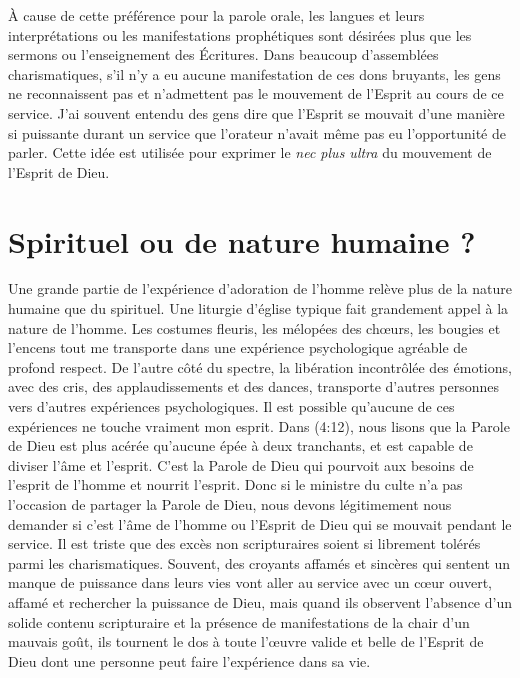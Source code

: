 À cause de cette préférence pour la parole orale, les langues
 et leurs interprétations ou les manifestations prophétiques
 sont désirées plus que les sermons ou l'enseignement des Écritures.
 Dans beaucoup d'assemblées charismatiques, s'il n'y a eu aucune
 manifestation de ces dons bruyants, les gens ne reconnaissent pas
 et n'admettent pas le mouvement de l'Esprit au cours de ce service.
 J'ai souvent entendu des gens dire que l'Esprit se mouvait d'une manière
 si puissante durant un service que l'orateur n'avait même pas eu
 l'opportunité de parler. Cette idée est utilisée pour exprimer le
 \emph{nec plus ultra} du mouvement de l'Esprit de Dieu.


\section*{Spirituel ou de nature humaine ?}

Une grande partie de l'expérience d'adoration de l'homme relève plus
 de la nature humaine que du spirituel.
 Une liturgie d'église typique fait grandement appel à la nature de l'homme.
 Les costumes fleuris, les mélopées des chœurs, les bougies et l'encens
 \ocadr tout me transporte dans une expérience psychologique agréable
 de profond respect. De l'autre côté du spectre, la libération incontrôlée
 des émotions, avec des cris, des applaudissements et des dances,
 transporte d'autres personnes vers d'autres expériences psychologiques.
 Il est possible qu'aucune de ces expériences ne touche vraiment mon esprit.
 Dans (4:12), nous lisons que la Parole de Dieu
 est plus acérée qu'aucune épée à deux tranchants,
 et est capable de diviser l'âme et l'esprit.
 C'est la Parole de Dieu qui pourvoit aux besoins de l'esprit de l'homme
 et nourrit l'esprit. Donc si le ministre du culte n'a pas l'occasion
 de partager la Parole de Dieu, nous devons légitimement nous demander
 si c'est l'âme de l'homme ou l'Esprit de Dieu qui se mouvait pendant
 le service. Il est triste que des excès non scripturaires soient si
 librement tolérés parmi les charismatiques.
 Souvent, des croyants affamés et sincères qui sentent un manque
 de puissance dans leurs vies vont aller au service avec un cœur ouvert,
 affamé et rechercher la puissance de Dieu, mais quand ils observent
 l'absence d'un solide contenu scripturaire et la présence
 de manifestations de la chair d'un mauvais goût, ils tournent le dos
 à toute l'œuvre valide et belle de l'Esprit de Dieu dont une personne
 peut faire l'expérience dans sa vie.


